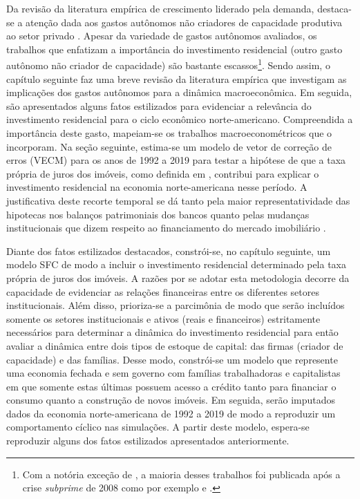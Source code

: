 Da revisão da literatura empírica de crescimento liderado pela demanda, destaca-se a atenção dada aos gastos autônomos não criadores de capacidade produtiva ao setor privado \cites{girardi_long-run_2016}{girardi_autonomous_2018}{freitas_pattern_2013}{braga_investment_2018}. Apesar da variedade de gastos autônomos avaliados, os trabalhos que enfatizam a importância do investimento residencial (outro gasto autônomo não criador de capacidade) são bastante escassos\footnote{Com a notória exceção de \textcite{leamer_housing_2007}, a maioria desses trabalhos foi publicada após a crise \textit{subprime} de 2008 como por exemplo \textcite{jorda_great_2014} e \textcite{fiebiger_semi-autonomous_2018}.}. 
Sendo assim, o capítulo seguinte faz uma breve revisão da literatura empírica que investigam as implicações dos gastos autônomos para a dinâmica macroeconômica.
Em seguida, são apresentados alguns fatos estilizados para evidenciar a relevância do investimento residencial para o ciclo econômico norte-americano.
Compreendida a importância deste gasto, mapeiam-se os trabalhos macroeconométricos que o incorporam.
Na seção seguinte, estima-se um modelo de vetor de correção de erros (VECM) para os anos de 1992 a 2019 para testar a hipótese de que  a taxa própria de juros dos imóveis, como definida em \textcite{teixeira_crescimento_2015}, 
contribui para explicar o investimento residencial na economia norte-americana nesse período. 
A justificativa deste recorte temporal se dá tanto pela maior representatividade das hipotecas nos balanços patrimoniais dos bancos \cite{jorda_great_2014} quanto pelas mudanças institucionais que dizem respeito ao financiamento do mercado imobiliário \cites{federal_deposit_insurance_corporation_savings_1997}{mishkin_evaluating_1997}{wall_too_2010}.


Diante dos fatos estilizados destacados, constrói-se, no capítulo seguinte, um modelo SFC de modo a incluir o investimento residencial determinado pela taxa própria de juros dos imóveis. 
A razões por se adotar esta metodologia decorre da capacidade de evidenciar as relações financeiras entre os diferentes setores institucionais. 
Além disso, prioriza-se a parcimônia de modo que serão incluídos somente os setores institucionais e ativos (reais e financeiros) estritamente necessários para determinar a dinâmica do investimento residencial para então avaliar a dinâmica entre dois tipos de estoque de capital: das firmas (criador de capacidade) e das famílias. 
Desse modo, constrói-se um modelo que represente uma economia fechada e sem governo
com famílias trabalhadoras e capitalistas em que somente estas últimas possuem acesso a crédito tanto para financiar o consumo quanto a construção de novos imóveis.
Em seguida, serão imputados dados da economia norte-americana de 1992 a 2019 de modo a reproduzir um comportamento cíclico nas simulações.
A partir deste modelo, espera-se reproduzir alguns dos fatos estilizados apresentados anteriormente.

